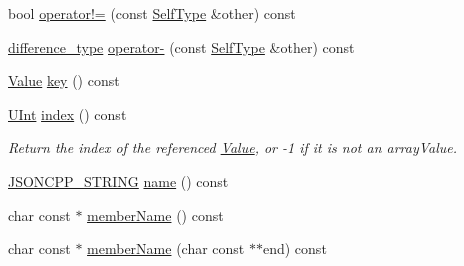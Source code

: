 \begin{DoxyCompactItemize}
\item 
bool \hyperlink{class_json_1_1_value_iterator_base_aa83bdcc8114b7d040eb8eb42eeed5f4a}{operator!=} (const \hyperlink{class_json_1_1_value_iterator_base_a9d2a940d03ea06d20d972f41a89149ee}{Self\+Type} \&other) const
\item 
\hyperlink{class_json_1_1_value_iterator_base_a4e44bf8cbd17ec8d6e2c185904a15ebd}{difference\+\_\+type} \hyperlink{class_json_1_1_value_iterator_base_a98e254263fca5f1fc8fcac7bcb0260bf}{operator-\/} (const \hyperlink{class_json_1_1_value_iterator_base_a9d2a940d03ea06d20d972f41a89149ee}{Self\+Type} \&other) const
\item 
\hyperlink{class_json_1_1_value}{Value} \hyperlink{class_json_1_1_value_iterator_base_a3838ba39c43c518cf3ed4aa6ce78ccad}{key} () const
\item 
\hyperlink{namespace_json_a800fb90eb6ee8d5d62b600c06f87f7d4}{U\+Int} \hyperlink{class_json_1_1_value_iterator_base_a549c66a0bd20e9ae772175a5c0d2e88a}{index} () const
\begin{DoxyCompactList}\small\item\em Return the index of the referenced \hyperlink{class_json_1_1_value}{Value}, or -\/1 if it is not an array\+Value. \end{DoxyCompactList}\item 
\hyperlink{json_8h_a1e723f95759de062585bc4a8fd3fa4be}{J\+S\+O\+N\+C\+P\+P\+\_\+\+S\+T\+R\+I\+NG} \hyperlink{class_json_1_1_value_iterator_base_a522989403c976fdbb94da846b99418db}{name} () const
\item 
char const  $\ast$ \hyperlink{class_json_1_1_value_iterator_base_a54765da6759fd3f1edcbfbaf308ec263}{member\+Name} () const
\item 
char const  $\ast$ \hyperlink{class_json_1_1_value_iterator_base_a391c9cbd0edf9a447b37df00e8ce6059}{member\+Name} (char const $\ast$$\ast$end) const
\end{DoxyCompactItemize}
